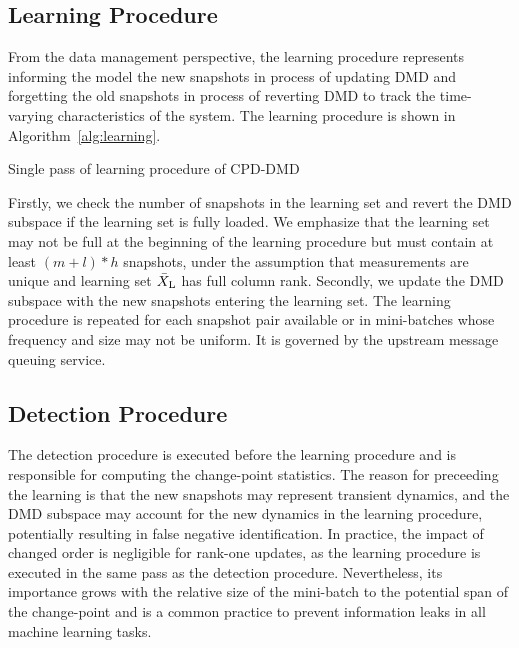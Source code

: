 \subsection{Learning Procedure}\label{learn-cpd}
From the data management perspective, the learning procedure represents informing the model the new snapshots in process of updating DMD and forgetting the old snapshots  in process of reverting DMD to track the time-varying characteristics of the system. The learning procedure is shown in Algorithm~\ref{alg:learning}.

\begin{algorithm}
	\caption{Single pass of learning procedure of CPD-DMD}\label{alg:learning}
	\begin{algorithmic}[1]
		\ENDIF{}
	\end{algorithmic}
\end{algorithm}

Firstly, we check the number of snapshots in the learning set and revert the DMD subspace if the learning set is fully loaded. We emphasize that the learning set may not be full at the beginning of the learning procedure but must contain at least \((m + l) * h\) snapshots, under the assumption that measurements are unique and learning set \(\bar{X} _{\text{L}}\) has full column rank. Secondly, we update the DMD subspace with the new snapshots entering the learning set. The learning procedure is repeated for each snapshot pair available or in mini-batches whose frequency and size may not be uniform. It is governed by the upstream message queuing service.

\subsection{Detection Procedure}\label{detect-cpd}
The detection procedure is executed before the learning procedure and is responsible for computing the change-point statistics. The reason for preceeding the learning is that the new snapshots may represent transient dynamics, and the DMD subspace may account for the new dynamics in the learning procedure, potentially resulting in false negative identification. In practice, the impact of changed order is negligible for rank-one updates, as the learning procedure is executed in the same pass as the detection procedure. Nevertheless, its importance grows with the relative size of the mini-batch to the potential span of the change-point and is a common practice to prevent information leaks in all machine learning tasks.

